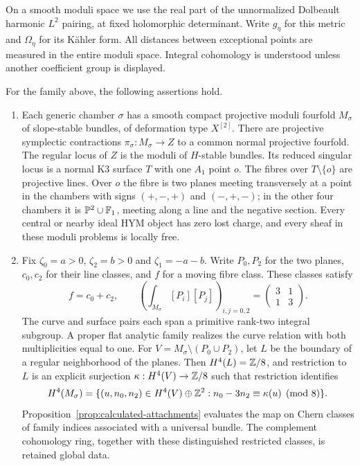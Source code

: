 On a smooth moduli space we use the real part of the unnormalized
Dolbeault harmonic $L^2$ pairing, at fixed holomorphic determinant.
Write $g_\eta$ for this metric and $\Omega_\eta$ for its K\"ahler
form. All distances between exceptional points are measured in the
entire moduli space. Integral cohomology is understood unless another
coefficient group is displayed.

\begin{theorem}\label{thm:main}
For the family above, the following assertions hold.
\begin{enumerate}
\item Each generic chamber $\sigma$ has a smooth compact projective
moduli fourfold $M_\sigma$ of slope-stable bundles, of deformation
type $X^{[2]}$. There are projective symplectic contractions
$\pi_\sigma:M_\sigma\to Z$ to a common normal projective fourfold.
The regular locus of $Z$ is the moduli of $H$-stable bundles. Its
reduced singular locus is a normal K3 surface $T$ with one $A_1$ point $o$.
The fibres over $T\setminus\{o\}$ are projective lines. Over $o$
the fibre is two planes meeting transversely at a point in the
chambers with signs $(+,-,+)$ and $(-,+,-)$; in the other four
chambers it is $\mathbb P^2\cup\mathbb F_1$, meeting along a line and the
negative section. Every central or nearby ideal HYM object has zero
lost charge, and every sheaf in these moduli problems is locally free.

\item Fix $\zeta_0=a>0$, $\zeta_2=b>0$ and
$\zeta_1=-a-b$. Write $P_0,P_2$ for the two planes, $c_0,c_2$
for their line classes, and $f$ for a moving fibre class. These
classes satisfy
\begin{equation}\label{eq:intro-specialization}
 f=c_0+c_2,
 \qquad
 \left(\int_{M_\sigma}[P_i][P_j]\right)_{i,j=0,2}
   =\begin{pmatrix}3&1\\1&3\end{pmatrix}.
\end{equation}
The curve and surface pairs each span a primitive rank-two integral
subgroup. A proper flat analytic family realizes the curve relation
with both multiplicities equal to one. For
$V=M_\sigma\setminus(P_0\cup P_2)$, let $L$ be the boundary of
a regular neighborhood of the planes. Then $H^4(L)=\mathbb Z/8$, and
restriction to $L$ is an explicit surjection
$\kappa:H^4(V)\to\mathbb Z/8$ such that restriction identifies
\begin{equation}\label{eq:intro-attachment}
 H^4(M_\sigma)=
 \{(u,n_0,n_2)\in H^4(V)\oplus\mathbb Z^2:
       n_0-3n_2\equiv\kappa(u)\pmod 8\}.
\end{equation}
Proposition~\ref{prop:calculated-attachments} evaluates the map on
Chern classes of family indices associated with a universal bundle.
The complement cohomology ring, together with these distinguished
restricted classes, is retained global data.


\end{enumerate}
\end{theorem}
